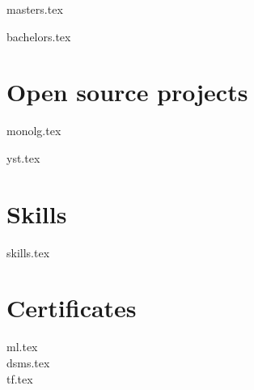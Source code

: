 \documentclass[]{deedy-resume-openfont}
\begin{document}
{masters.tex}

\sectionsep

{bachelors.tex}

\sectionsep


\section{Open source projects}

{monolg.tex}

\sectionsep

{yst.tex}

\sectionsep


\section{Skills}
{skills.tex}

\sectionsep

\section{Certificates}
{ml.tex}
\vspace{\topsep}\\
{dsms.tex}
\vspace{\topsep}\\
{tf.tex}
\end{document}
